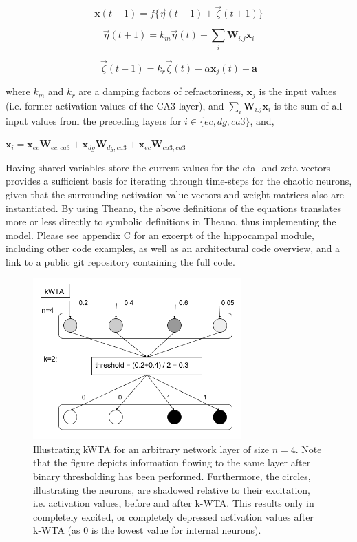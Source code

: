 \begin{equation}\label{eq:eta_zeta_sum}
    \textbf{x}(t+1) = f\{ \vec{\eta}(t+1) + \vec{\zeta}(t+1) \}
\end{equation}

\begin{equation}
    \vec{\eta}(t+1) = k_m \vec{\eta}(t) + \sum_{i} \textbf{W}_{i.j} \textbf{x}_i
\end{equation}

\begin{equation}
    \vec{\zeta}(t+1) = k_r \vec{\zeta}(t) - \alpha \textbf{x}_j(t) + \textbf{a}
\end{equation}

where $k_m$ and $k_r$ are a damping factors of refractoriness, $\textbf{x}_j$ is the input values (i.e. former activation values of the CA3-layer), and $\sum_{i} \textbf{W}_{i.j} \textbf{x}_i$ is the sum of all input values from the preceding layers for $i\in\{ec, dg, ca3\}$, and,

\begin{center}
\begin{math}
    \textbf{x}_i = \textbf{x}_{ec} \textbf{W}_{ec, ca3} + \textbf{x}_{dg} \textbf{W}_{dg, ca3} + \textbf{x}_{ec} \textbf{W}_{ca3, ca3}
\end{math}
\end{center}

Having shared variables store the current values for the eta- and zeta-vectors provides a sufficient basis for iterating through time-steps for the chaotic neurons, given that the surrounding activation value vectors and weight matrices also are instantiated. By using Theano, the above definitions of the equations translates more or less directly to symbolic definitions in Theano, thus implementing the model. Please see appendix C for an excerpt of the hippocampal module, including other code examples, as well as an architectural code overview, and a link to a public git repository containing the full code.

\begin{figure}
    \centering
    \includegraphics[width=8cm]{fig/kWTA}
    \caption{Illustrating kWTA for an arbitrary network layer of size $n=4$. Note that the figure depicts information flowing to  the same layer after binary thresholding has been performed. Furthermore, the circles, illustrating the neurons, are shadowed relative to their excitation, i.e. activation values, before and after k-WTA. This results only in completely excited, or completely depressed activation values after k-WTA (as 0 is the lowest value for internal neurons).}
    \label{fig:kWTA_illustration}
\end{figure}


